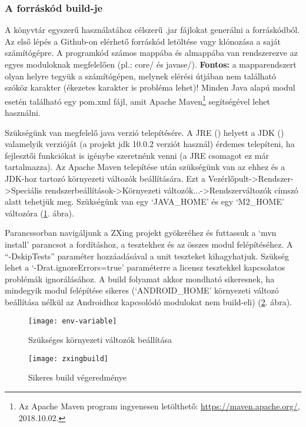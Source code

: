 \documentclass[../documentation.tex]{subfiles}
\begin{document}
\subsubsection{A forráskód build-je}
A könyvtár egyszerű használatához célszerű .jar fájlokat generálni a forráskódból. Az első lépés a Github-on elérhető forráskód letöltése vagy klónozása a saját számítógépre. A programkód számos mappába és almappába van rendszerezve az egyes moduloknak megfelelően (pl.: core/ és javase/). \textbf{Fontos:} a mapparendszert olyan helyre tegyük a számítógépen, melynek elérési útjában nem található szóköz karakter (ékezetes karakter is probléma lehet)! Minden Java alapú modul esetén található egy pom.xml fájl, amit Apache Maven\footnote{Az Apache Maven program ingyenesen letölthető: \url{https://maven.apache.org/}, 2018.10.02.} segítségével lehet használni.

Szükségünk van megfelelő java verzió telepítésére. A JRE () helyett a JDK () valamelyik verzióját (a projekt jdk 10.0.2 verziót használ) érdemes telepíteni, ha fejlesztői funkciókat is igénybe szeretnénk venni (a JRE csomagot ez már tartalmazza). Az Apache Maven telepítése után szükségünk van az ehhez és a JDK-hoz tartozó környezeti változók beállítására. Ezt a Vezérlőpult->Rendszer->Speciális rendszerbeállítások->Környezeti változók...->Rendszerváltozók címszó alatt tehetjük meg. Szükségünk van egy `JAVA\_HOME' és egy `M2\_HOME' változóra (\ref{fig:envvar}. ábra).

Parancssorban navigáljunk a ZXing projekt gyökeréhez és futtassuk a `mvn install' parancsot a fordításhoz, a tesztekhez és az összes modul felépítéséhez. A ``-DskipTests'' paraméter hozzáadásával a unit teszteket kihagyhatjuk. Szükség lehet a `-Drat.ignoreErrors=true' paraméterre a licensz tesztekkel kapcsolatos problémák ignorálásához. A build folyamat akkor mondható sikeresnek, ha mindegyik modul felépítése sikeres (`ANDROID\_HOME' környezeti változó beállítása nélkül az Androidhoz kapcsolódó modulokat nem build-eli) (\ref{fig:buildsuccess}. ábra).

\begin{figure}[h]
\centering
\texttt{[image: env-variable]}
\caption{Szükséges környezeti változók beállítása}
\label{fig:envvar}
\end{figure}

\begin{figure}[h]
\centering
\texttt{[image: zxingbuild]}
\caption{Sikeres build végeredménye}
\label{fig:buildsuccess}
\end{figure}
\end{document}
